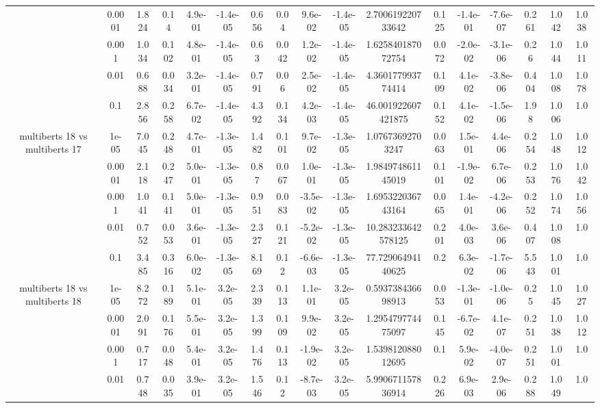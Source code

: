 \begin{tabular}{|c|c|c|c|c|c|c|c|c|c|c|c|c|c|c|c|c|}
 & 0.0001 & 1.824 & 0.14 & 4.9e-01 & -1.4e-05 & 0.656 & 0.04 & 9.6e-02 & -1.4e-05 & 2.700619220733642 & 0.125 & -1.4e-01 & -7.6e-07 & 0.261 & 1.042 & 1.038 \\
 & 0.001 & 1.034 & 0.102 & 4.8e-01 & -1.4e-05 & 0.63 & 0.042 & 1.2e-02 & -1.4e-05 & 1.625840187072754 & 0.072 & -2.0e-02 & -3.1e-06 & 0.26 & 1.044 & 1.011 \\
 & 0.01 & 0.688 & 0.034 & 3.2e-01 & -1.4e-05 & 0.791 & 0.06 & 2.5e-02 & -1.4e-05 & 4.360177993774414 & 0.109 & 4.1e-02 & -3.8e-06 & 0.404 & 1.008 & 1.078 \\
 & 0.1 & 2.856 & 0.258 & 6.7e-02 & -1.4e-05 & 4.392 & 0.134 & 4.2e-03 & -1.4e-05 & 46.001922607421875 & 0.152 & 4.1e-02 & -1.5e-06 & 1.98 & 1.006 & 1.0 \\
\hline
\multirow{5}{*}{multiberts 18 vs multiberts 17} & 1e-05 & 7.045 & 0.248 & 4.7e-01 & -1.3e-05 & 1.482 & 0.101 & 9.7e-02 & -1.3e-05 & 1.07673692703247 & 0.063 & 1.5e-01 & 4.4e-06 & 0.254 & 1.048 & 1.012 \\
 & 0.0001 & 2.118 & 0.247 & 5.0e-01 & -1.3e-05 & 0.87 & 0.067 & 1.0e-01 & -1.3e-05 & 1.984974861145019 & 0.101 & -1.9e-02 & 6.7e-06 & 0.253 & 1.076 & 1.042 \\
 & 0.001 & 1.041 & 0.141 & 5.0e-01 & -1.3e-05 & 0.951 & 0.083 & -3.5e-02 & -1.3e-05 & 1.695322036743164 & 0.065 & 1.4e-01 & -4.2e-06 & 0.252 & 1.074 & 1.056 \\
 & 0.01 & 0.752 & 0.053 & 3.6e-01 & -1.3e-05 & 2.327 & 0.121 & -5.2e-02 & -1.3e-05 & 10.283233642578125 & 0.201 & 4.0e-03 & 3.6e-06 & 0.407 & 1.008 & 1.0 \\
 & 0.1 & 3.485 & 0.316 & 6.0e-02 & -1.3e-05 & 8.169 & 0.12 & -6.6e-03 & -1.3e-05 & 77.72906494140625 & 0.2 & 6.3e-02 & -1.7e-06 & 5.543 & 1.001 & 1.0 \\
\hline
\multirow{5}{*}{multiberts 18 vs multiberts 18} & 1e-05 & 8.272 & 0.189 & 5.1e-01 & 3.2e-05 & 2.339 & 0.113 & 1.1e-01 & 3.2e-05 & 0.593738436698913 & 0.053 & -1.3e-01 & -1.0e-06 & 0.25 & 1.045 & 1.027 \\
 & 0.0001 & 2.091 & 0.176 & 5.5e-01 & 3.2e-05 & 1.399 & 0.109 & 9.9e-02 & 3.2e-05 & 1.295479774475097 & 0.145 & -6.7e-02 & 4.1e-07 & 0.251 & 1.038 & 1.012 \\
 & 0.001 & 0.717 & 0.048 & 5.4e-01 & 3.2e-05 & 1.476 & 0.113 & -1.9e-02 & 3.2e-05 & 1.539812088012695 & 0.1 & 5.9e-02 & -4.0e-07 & 0.251 & 1.001 & 1.0 \\
 & 0.01 & 0.748 & 0.035 & 3.9e-01 & 3.2e-05 & 1.546 & 0.12 & -8.7e-03 & 3.2e-05 & 5.990671157836914 & 0.226 & 6.9e-03 & 2.9e-06 & 0.288 & 1.049 & 1.0 \\

\end{tabular}
